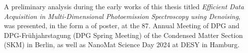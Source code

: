 A preliminary analysis during the early works of this thesis titled
\textit{Efficient Data Acquisition in Multi-Dimensional Photoemission Spectroscopy using Denoising}, was presented, in the form a of poster, at the 87. Annual Meeting of DPG and DPG-Frühjahrstagung (DPG Spring Meeting) of the Condensed Matter Section (SKM) in Berlin, as well as NanoMat Science Day 2024 at DESY in Hamburg. 

